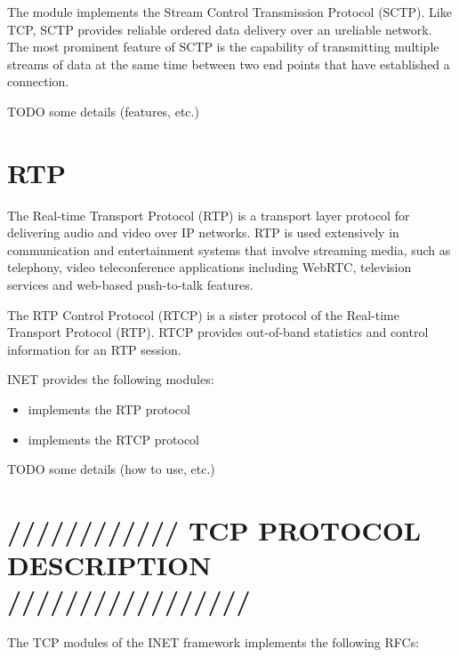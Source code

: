 The  module implements the Stream Control Transmission Protocol
(SCTP). Like TCP, SCTP provides reliable ordered data delivery over an ureliable
network. The most prominent feature of SCTP is the capability of transmitting
multiple streams of data at the same time between two end points that have
established a connection.

TODO some details (features, etc.)

\section{RTP}
\label{sec:transport:rtp}

The Real-time Transport Protocol (RTP) is a transport layer protocol for
delivering audio and video over IP networks. RTP is used extensively in
communication and entertainment systems that involve streaming media, such as
telephony, video teleconference applications including WebRTC, television
services and web-based push-to-talk features.

The RTP Control Protocol (RTCP) is a sister protocol of the Real-time Transport
Protocol (RTP). RTCP provides out-of-band statistics and control information for
an RTP session.

INET provides the following modules:

\begin{itemize}
  \item {} implements the RTP protocol
  \item {} implements the RTCP protocol
\end{itemize}

TODO some details (how to use, etc.)


\section{//////////// TCP PROTOCOL DESCRIPTION /////////////////}


The TCP modules of the INET framework implements the following RFCs:

